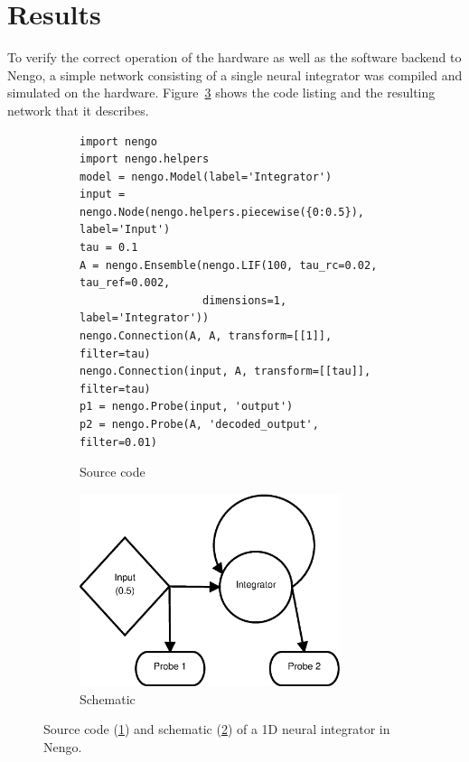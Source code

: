 \documentclass[english]{article}
\begin{document}
\section{Results}

To verify the correct operation of the hardware as well as the software backend to Nengo, a simple network consisting of a single neural integrator was compiled and simulated on the hardware.
Figure~\ref{lst:integrator1d} shows the code listing and the resulting network that it describes.
\begin{figure}
\centering

\begin{subfigure}[b]{\textwidth}
\centering
\lstset{language=Python}
\begin{lstlisting}[frame=single]
import nengo
import nengo.helpers
model = nengo.Model(label='Integrator')
input = nengo.Node(nengo.helpers.piecewise({0:0.5}), label='Input')
tau = 0.1
A = nengo.Ensemble(nengo.LIF(100, tau_rc=0.02, tau_ref=0.002,
                   dimensions=1, label='Integrator'))
nengo.Connection(A, A, transform=[[1]], filter=tau)
nengo.Connection(input, A, transform=[[tau]], filter=tau)
p1 = nengo.Probe(input, 'output')
p2 = nengo.Probe(A, 'decoded_output', filter=0.01)
\end{lstlisting}
\caption{Source code}
\label{lst:integrator1d:code}
\end{subfigure}

\begin{subfigure}[b]{0.3\textwidth}
\centering
\includegraphics[width=3.0in]{integrator-1d-schematic.eps}
\caption{Schematic}
\label{lst:integrator1d:schematic}
\end{subfigure}

\caption[A 1D neural integrator in Nengo.]
{Source code (\ref{lst:integrator1d:code}) and schematic (\ref{lst:integrator1d:schematic}) of a 1D neural integrator in Nengo.}
\label{lst:integrator1d}
\end{figure}
\end{document}
